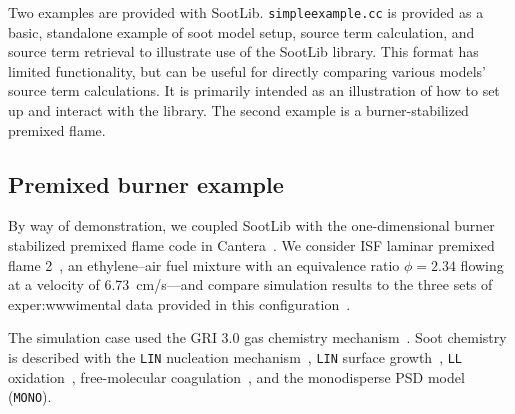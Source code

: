 \documentclass[preprint,letterpaper]{elsarticle}
\begin{document}
Two examples are provided with SootLib. 
\texttt{simple\textunderscore example.cc} is provided as a basic, standalone example of soot model setup, source term calculation, and source term retrieval to illustrate use of the SootLib library. This format has limited functionality, but can be useful for directly comparing various models' source term calculations. 
It is primarily intended as an illustration of how to set up and interact with the library. The second example is a burner-stabilized premixed flame.

\subsection{Premixed burner example}
\label{s:soot-examples-premixed}

By way of demonstration, we coupled SootLib with the one-dimensional burner stabilized premixed flame code in Cantera~\cite{Cantera}. We consider ISF laminar premixed flame 2~\cite{ISF4-P2}, an ethylene--air fuel mixture with an equivalence ratio $\phi=2.34$ flowing at a velocity of \qty{6.73}{\cm/\s}---and compare simulation results to the three sets of exper:wwwimental data provided in this configuration~\cite{Xu_1997,Menon_2007}.

The simulation case used the GRI 3.0 gas chemistry mechanism~\cite{Smith_2002}. Soot chemistry is described with the \texttt{LIN} nucleation mechanism~\cite{Lindstedt_2005}, \texttt{LIN} surface growth~\cite{Lindstedt_1994}, \texttt{LL} oxidation~\cite{Leung_1991}, free-molecular coagulation~\cite{Seinfeld_2016}, and the monodisperse PSD model (\texttt{MONO}).
\end{document}

